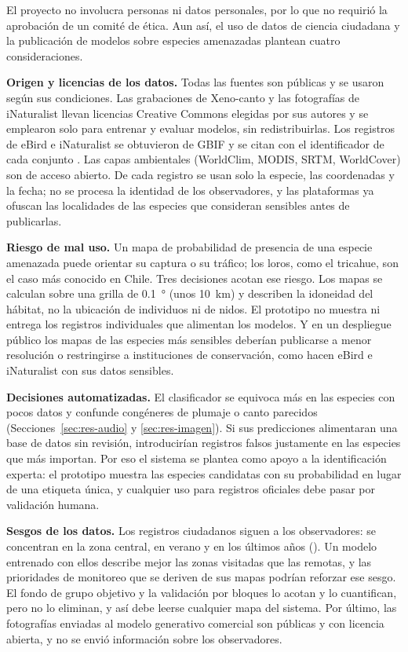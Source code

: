 El proyecto no involucra personas ni datos personales, por lo que no requirió
la aprobación de un comité de ética. Aun así, el uso de datos de ciencia
ciudadana y la publicación de modelos sobre especies amenazadas plantean
cuatro consideraciones.

\textbf{Origen y licencias de los datos.} Todas las fuentes son públicas y se
usaron según sus condiciones. Las grabaciones de Xeno-canto y las fotografías
de iNaturalist llevan licencias Creative Commons elegidas por sus autores y
se emplearon solo para entrenar y evaluar modelos, sin redistribuirlas. Los
registros de eBird e iNaturalist se obtuvieron de GBIF y se citan con el
identificador de cada conjunto \citep{ebird2026gbif, inat2026gbif}. Las capas
ambientales (WorldClim, MODIS, SRTM, WorldCover) son de acceso abierto. De
cada registro se usan solo la especie, las coordenadas y la fecha; no se
procesa la identidad de los observadores, y las plataformas ya ofuscan las
localidades de las especies que consideran sensibles antes de publicarlas.

\textbf{Riesgo de mal uso.} Un mapa de probabilidad de presencia de una
especie amenazada puede orientar su captura o su tráfico; los loros, como el
tricahue, son el caso más conocido en Chile. Tres decisiones acotan ese
riesgo. Los mapas se calculan sobre una grilla de \SI{0,1}{\degree} (unos
\SI{10}{\kilo\metre}) y describen la idoneidad del hábitat, no la ubicación
de individuos ni de nidos. El prototipo no muestra ni entrega los registros
individuales que alimentan los modelos. Y en un despliegue público los mapas
de las especies más sensibles deberían publicarse a menor resolución o
restringirse a instituciones de conservación, como hacen eBird e iNaturalist
con sus datos sensibles.

\textbf{Decisiones automatizadas.} El clasificador se equivoca más en las
especies con pocos datos y confunde congéneres de plumaje o canto parecidos
(Secciones~\ref{sec:res-audio} y \ref{sec:res-imagen}). Si sus predicciones
alimentaran una base de datos sin revisión, introducirían registros falsos
justamente en las especies que más importan. Por eso el sistema se plantea
como apoyo a la identificación experta: el prototipo muestra las especies
candidatas con su probabilidad en lugar de una etiqueta única, y cualquier
uso para registros oficiales debe pasar por validación humana.

\textbf{Sesgos de los datos.} Los registros ciudadanos siguen a los
observadores: se concentran en la zona central, en verano y en los últimos
años (). Un modelo entrenado con ellos describe
mejor las zonas visitadas que las remotas, y las prioridades de monitoreo
que se deriven de sus mapas podrían reforzar ese sesgo. El fondo de grupo
objetivo y la validación por bloques lo acotan y lo cuantifican, pero no lo
eliminan, y así debe leerse cualquier mapa del sistema. Por último, las
fotografías enviadas al modelo generativo comercial son públicas y con
licencia abierta, y no se envió información sobre los observadores.

